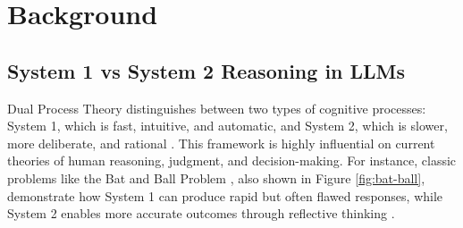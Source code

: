 \section{Background}\label{sec:background}
    
    \subsection{System 1 vs System 2 Reasoning in LLMs}\label{sec:s1vs2}
        
        Dual Process Theory distinguishes between two types of cognitive processes: System 1, which is fast, intuitive, and automatic, and System 2, which is slower, more deliberate, and rational \citep{evans_dual-process_2013}. This framework is highly influential on current theories of human reasoning, judgment, and decision-making. For instance, classic problems like the Bat and Ball Problem \citep{frederick_cognitive_2005}, also shown in Figure \ref{fig:bat-ball}, demonstrate how System 1 can produce rapid but often flawed responses, while System 2 enables more accurate outcomes through reflective thinking \citep{evans_dual-processing_2008, evans_reflections_2019}.


